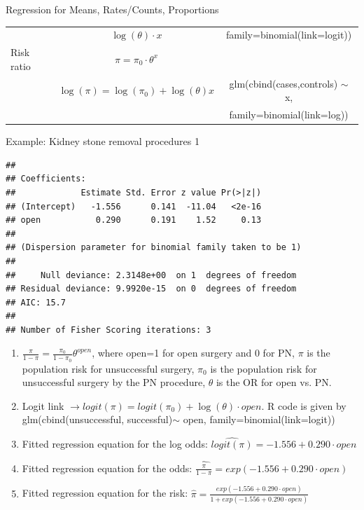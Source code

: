 \documentclass{beamer}\usepackage[]{graphicx}\usepackage[]{color}
\newenvironment{knitrout}{}{} %
\begin{document}
\begin{frame}{Regression for Means, Rates/Counts, Proportions}
{\begin{center}
\begin{tabular}{|l|c|c|}
& $\log(\theta)\cdot x$ & family=binomial(link=logit))\\
\Xhline{.1\arrayrulewidth}						
\hspace{0.2cm} Risk ratio &  $\pi = \pi_0 \cdot \theta^x$   & \\
& $\log(\pi) = \log(\pi_0) + \log(\theta) x$ & glm(cbind(cases,controls) $\sim$ x, \\
&  & family=binomial(link=log))\\							
\hline
		\end{tabular}
	\end{center}
}
\end{frame}



\begin{frame}[fragile]{Example: Kidney stone removal procedures 1}

\begin{knitrout}\tiny
{}\color{fgcolor}
\begin{verbatim}
## 
## Coefficients:
##             Estimate Std. Error z value Pr(>|z|)
## (Intercept)   -1.556      0.141  -11.04   <2e-16
## open           0.290      0.191    1.52     0.13
## 
## (Dispersion parameter for binomial family taken to be 1)
## 
##     Null deviance: 2.3148e+00  on 1  degrees of freedom
## Residual deviance: 9.9920e-15  on 0  degrees of freedom
## AIC: 15.7
## 
## Number of Fisher Scoring iterations: 3
\end{verbatim}

\end{knitrout}

\scriptsize
\begin{enumerate}
	\item $\frac{\pi}{1-\pi} = \frac{\pi_0}{1-\pi_0} \theta^{open}$, where open=1 for open surgery and 0 for PN, $\pi$ is the population risk for unsuccessful surgery, $\pi_0$ is the population risk for unsuccessful surgery by the PN procedure, $\theta$ is the OR for open vs. PN.  \pause
	\item Logit link $\to logit(\pi) = logit(\pi_0) + \log(\theta) \cdot open$. R code is given by glm(cbind(unsuccessful, successful)$\sim$ open, family=binomial(link=logit))  \pause
	\item Fitted regression equation for the log odds: $\widehat{logit(\pi)} = -1.556 + 0.290 \cdot open$ \pause
		\item Fitted regression equation for the odds: $\widehat{\frac{\pi}{1-\pi}} = exp(-1.556 + 0.290 \cdot open)$ \pause
				\item Fitted regression equation for the risk: $\widehat{\pi} = \frac{exp(-1.556 + 0.290 \cdot open)}{1+exp(-1.556 + 0.290 \cdot open)}$
\end{enumerate}

\end{frame}
\end{document}
